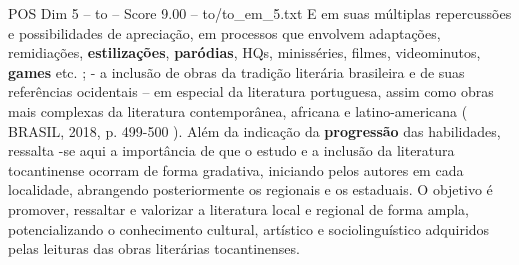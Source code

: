 \begin{textsample}{POS Dim 5 – to – Score 9.00 – to/to\_em\_5.txt}
E em suas múltiplas repercussões e possibilidades de apreciação, em processos que envolvem adaptações, remidiações, \textbf{estilizações}, \textbf{paródias}, HQs, minisséries, filmes, videominutos, \textbf{games} etc. ; - a inclusão de obras da tradição literária brasileira e de suas referências ocidentais – em especial da literatura portuguesa, assim como obras mais complexas da literatura contemporânea, africana e latino-americana ( BRASIL, 2018, p. 499-500 ).
Além da indicação da \textbf{progressão} das habilidades, ressalta -se aqui a importância de que o estudo e a inclusão da literatura tocantinense ocorram de forma gradativa, iniciando pelos autores em cada localidade, abrangendo posteriormente os regionais e os estaduais.
O objetivo é promover, ressaltar e valorizar a literatura local e regional de forma ampla, potencializando o conhecimento cultural, artístico e sociolinguístico adquiridos pelas leituras das obras literárias tocantinenses.

\end{textsample}
